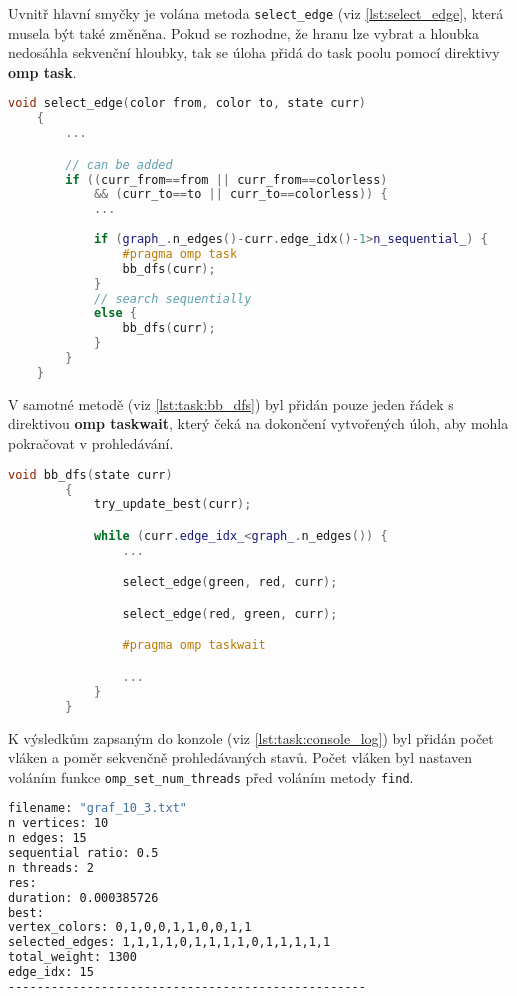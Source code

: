 Uvnitř hlavní smyčky je volána metoda \texttt{select\_edge} (viz \ref{lst:select_edge}, která musela být také změněna.
Pokud se rozhodne, že hranu lze vybrat a hloubka nedosáhla sekvenční hloubky, tak se úloha přidá do task poolu pomocí direktivy \textbf{omp task}.

\begin{lstlisting}[language=C++, label={lst:select_edge}, title={Metoda pro označení hrany}]
    void select_edge(color from, color to, state curr)
    {
        ...

        // can be added
        if ((curr_from==from || curr_from==colorless)
            && (curr_to==to || curr_to==colorless)) {
            ...
            
            if (graph_.n_edges()-curr.edge_idx()-1>n_sequential_) {
                #pragma omp task
                bb_dfs(curr);
            }
            // search sequentially
            else {
                bb_dfs(curr);
            }
        }
    }
\end{lstlisting}

V samotné metodě (viz \ref{lst:task:bb_dfs}) byl přidán pouze jeden řádek s direktivou \textbf{omp taskwait}, který čeká na dokončení vytvořených úloh, aby mohla pokračovat v prohledávání.

\begin{lstlisting}[language=C++, label={lst:task:bb_dfs}, title={Metoda pro prohledávání stavového prostoru}]
        void bb_dfs(state curr)
        {
            try_update_best(curr);

            while (curr.edge_idx_<graph_.n_edges()) {
                ...

                select_edge(green, red, curr);

                select_edge(red, green, curr);

                #pragma omp taskwait

                ...
            }
        }
\end{lstlisting}

K výsledkům zapsaným do konzole (viz \ref{lst:task:console_log}) byl přidán počet vláken a poměr sekvenčně prohledávaných stavů.
Počet vláken byl nastaven voláním funkce \texttt{omp\_set\_num\_threads} před voláním metody \texttt{find}.

\begin{lstlisting}[language=bash, label={lst:task:console_log}, title={Příklad výpisu výsledků}]
filename: "graf_10_3.txt"
n vertices: 10
n edges: 15
sequential ratio: 0.5
n threads: 2
res:
duration: 0.000385726
best:
vertex_colors: 0,1,0,0,1,1,0,0,1,1
selected_edges: 1,1,1,1,0,1,1,1,1,0,1,1,1,1,1
total_weight: 1300
edge_idx: 15
--------------------------------------------------
\end{lstlisting}